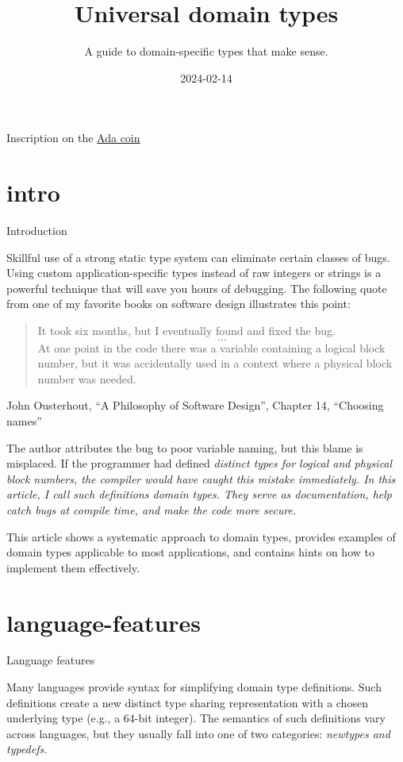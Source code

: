 \documentclass{article}
\title{Universal domain types}
\subtitle{A guide to domain-specific types that make sense.}
\date{2024-02-14}
\begin{document}
\epigraph{
}{Inscription on the \href{https://people.cs.kuleuven.be/~dirk.craeynest/ada-belgium/pictures/ada-strong.html}{Ada coin}}

\section{intro}{Introduction}

Skillful use of a strong static type system can eliminate certain classes of bugs.
Using custom application-specific types instead of raw integers or strings is a powerful technique that will save you hours of debugging.
The following quote from one of my favorite books on software design illustrates this point:

\blockquote{
  It took six months, but I eventually found and fixed the bug. \[\ldots\]
  At one point in the code there was a  variable containing a logical block number, but it was accidentally used in a context where a physical block number was needed.
}{John Ousterhout, ``A Philosophy of Software Design'', Chapter 14, ``Choosing names''}

The author attributes the bug to poor variable naming, but this blame is misplaced.
If the programmer had defined \em{distinct types} for logical and physical block numbers, the compiler would have caught this mistake immediately.
In this article, I call such definitions \em{domain types}.
They serve as documentation, help catch bugs at compile time, and make the code more secure.

This article shows a systematic approach to domain types, provides examples of domain types applicable to most applications, and contains hints on how to implement them effectively.

\section{language-features}{Language features}

Many languages provide syntax for simplifying domain type definitions.
Such definitions create a new distinct type sharing representation with a chosen underlying type (e.g., a 64-bit integer).
The semantics of such definitions vary across languages, but they usually fall into one of two categories: \em{newtypes} and \em{typedefs}.
\end{document}
